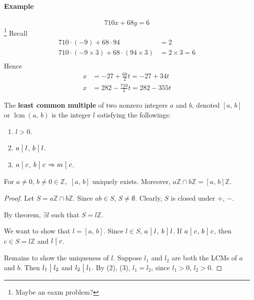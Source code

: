 \paragraph{Example}
\[
    710 x + 68 y = 6
\]\footnote{Maybe an eaxm problem?}
Recall
\begin{align*}
    710\cdot\left(-9\right)+68\cdot94&=2 \\
    710\cdot\left(-9\times 3\right)+68\cdot\left(94\times 3\right)&=2\times3=6 \\
\end{align*}
Hence
\begin{align*}
    x&=-27+\frac{68}{2}t=-27+34t \\
    x&=282-\frac{710}{2}t=282-355t
\end{align*}

\begin{definition}
    The \textbf{least common multiple} of two nonzero integers $a$ and $b$,
    denoted $\left[a,\,b\right]$ or $\mathop{\mathrm{lcm}}\left(a,\,b\right)$
    is the integer $l$ satisfying the followings:
    \begin{enumerate}
        \item $l>0$.
        \item $a\bigm| l$, $b\bigm| l$.
        \item $a\bigm| c$, $b\bigm| c$ $\Rightarrow m\bigm| c$.
    \end{enumerate}
\end{definition}

\begin{theorem}
    For $a\neq 0,\,b\neq 0 \in \mathbb{Z},$ $\left[a,\,b\right]$ uniquely exists.
    Moreover, $a\mathbb{Z} \cap b\mathbb{Z} = \left[a,\,b\right]\mathbb{Z}$.
\end{theorem}

\begin{proof}
    Let $S=a\mathbb{Z} \cap b\mathbb{Z}$.
    Since $ab \in S$, $S \neq \emptyset$. Clearly, $S$ is closed under $+$, $-$.

    By theorem, $\exists l$ such that $S = l\mathbb{Z}$.

    We want to show that $l=\left[a,\,b\right]$. Since $l\in S$, $a\bigm| l$,
    $b\bigm| l$. If $a\bigm| c$, $b\bigm| c$, then $c \in S = l\mathbb{Z}$ and $l\bigm| c$.

    Remains to show the uniqueness of $l$. Suppose $l_1$ and $l_2$ are both the
    LCMs of $a$ and $b$. Then $l_1 \bigm| l_2$ and $l_2 \bigm| l_1$.
    By (2), (3), $l_1=l_2$, since $l_1>0,\,l_2>0$.
\end{proof}

